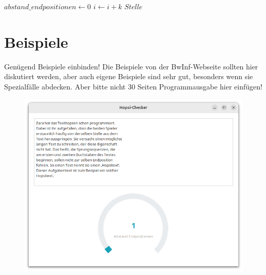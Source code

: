 \documentclass[a4paper,10pt,ngerman]{scrartcl}
\begin{document}
\begin{algorithmic}
            \State $abstand\_endpositionen\gets 0$ 
        \Else
            \State $i\gets i+k$
    \EndIf
    \Return $Stelle$
\end{algorithmic}

\section{Beispiele}
Genügend Beispiele einbinden! Die Beispiele von der BwInf-Webseite sollten hier diskutiert werden, aber auch eigene Beispiele 
sind sehr gut, besonders wenn sie Spezialfälle abdecken. Aber bitte nicht 30 Seiten Programmausgabe hier einfügen!
\begin{figure}[h]
	\centering
	\includegraphics[width=0.7\linewidth]{Beispiel_BWINF_2}
	\caption{}
	\label{fig:beispielbwinf2}
\end{figure}
\end{document}
